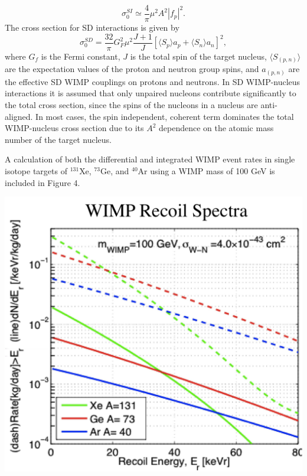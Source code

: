 \documentclass[a4paper,12pt]{article}
\begin{document}
\[\sigma_0^{SI} \simeq \frac{4}{\pi}\mu^2 A^2 |f_p|^2. \]
The cross section for SD interactions is given by
\[\sigma_0^{SD}=\frac{32}{\pi}G_F^2\mu^2\frac{J+1}{J}[\langle S_p \rangle a_p + \langle S_n \rangle a_n]^2, \]
where $G_f$ is the Fermi constant, $J$ is the total spin of the target nucleus, $\langle S_{(p,n)} \rangle$ are the expectation values of the proton and neutron group spins, and $a_{(p,n)}$ are the effective SD WIMP couplings on protons and neutrons.  In SD WIMP-nucleus interactions it is assumed that only unpaired nucleons contribute significantly to the total cross section, since the spins of the nucleons in a nucleus are anti-aligned.  In most cases, the spin independent, coherent term dominates the total WIMP-nucleus cross section due to its $A^2$ dependence on the atomic mass number of the target nucleus.

A calculation of both the differential and integrated WIMP event rates in single isotope targets of  $^{131}$Xe, $^{73}$Ge, and $^{40}$Ar using a WIMP mass of 100 GeV is included in Figure 4.

\begin{center}
\includegraphics[scale=0.5]{Recoil-spectrum.png}
\end{center}
\end{document}

